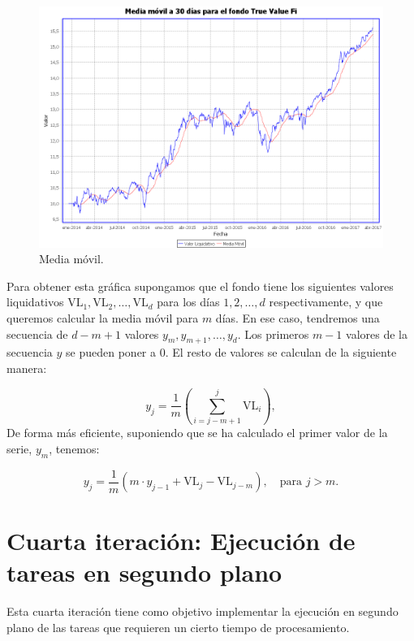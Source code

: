 \documentclass[12pt, a4paper]{book}
\begin{document}
	\begin{figure}[htbp]
	\centering
	\includegraphics[width=\textwidth]{figuras/media.PNG}
	\caption{Media móvil.}
	\label{fig:media}
	\end {figure}
	
	Para obtener esta gráfica supongamos que el fondo tiene los siguientes valores liquidativos $\text{VL}_1,\text{VL}_2,\ldots,\text{VL}_d$ para los días $1,2,\ldots,d$ respectivamente, y que queremos calcular la media móvil para $m$ días. En ese caso, tendremos una secuencia de $d-m+1$ valores $y_m,y_{m+1},\ldots,y_d$. Los primeros $m-1$ valores de la secuencia $y$ se pueden poner a $0$. El resto de valores se calculan de la siguiente manera:
	
	\begin{equation}
	y_j=\frac{1}{m}\left(\sum_{i=j-m+1}^{j}\text{VL}_i\right),
	\end{equation}
	De forma más eficiente, suponiendo que se ha calculado el primer valor de la serie, $y_m$, tenemos:
	
	\begin{equation}
	y_{j}=\frac{1}{m}\left(m\cdot y_{j-1}+\text{VL}_j-\text{VL}_{j-m}\right),\quad\text{para }j>m.
	\end{equation}

\newpage

\section{Cuarta iteración: Ejecución de tareas en segundo plano}

Esta cuarta iteración tiene como objetivo implementar la ejecución en segundo plano de las tareas que requieren un cierto tiempo de procesamiento.\\
\end{document}
